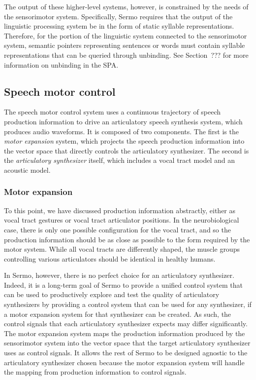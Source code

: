 The output of these higher-level systems,
however, is constrained by the needs
of the sensorimotor system.
Specifically, Sermo requires that
the output of the
linguistic processing system
be in the form of static syllable representations.
Therefore, for the portion
of the linguistic system connected
to the sensorimotor system,
semantic pointers representing
sentences or words must contain
syllable representations that can be
queried through unbinding.
See Section~??? for more information
on unbinding in the SPA.

\subsection{Speech motor control}

The speech motor control system
uses a continuous trajectory
of speech production information
to drive an articulatory
speech synthesis system,
which produces audio waveforms.
It is composed of two components.
The first is the \textit{motor expansion} system,
which projects the speech production information
into the vector space that
directly controls the articulatory synthesizer.
The second is
the \textit{articulatory synthesizer} itself,
which includes a vocal tract model
and an acoustic model.

\subsubsection{Motor expansion}

To this point, we have discussed
production information abstractly,
either as vocal tract gestures
or vocal tract articulator positions.
In the neurobiological case,
there is only one possible
configuration for the vocal tract,
and so the production information
should be as close as possible to the
form required by the motor system.
While all vocal tracts are differently shaped,
the muscle groups controlling various articulators
should be identical in healthy humans.

In Sermo, however,
there is no perfect choice
for an articulatory synthesizer.
Indeed, it is a long-term goal of Sermo
to provide a unified control system
that can be used to productively
explore and test the quality
of articulatory synthesizers
by providing a control system
that can be used for any synthesizer,
if a motor expansion system
for that synthesizer can be created.
As such, the control signals
that each articulatory synthesizer
expects may differ significantly.
The motor expansion system
maps the production information
produced by the sensorimotor system
into the vector space that
the target articulatory synthesizer
uses as control signals.
It allows the rest of Sermo
to be designed agnostic
to the articulatory synthesizer chosen
because the motor expansion system
will handle the mapping
from production information
to control signals.

